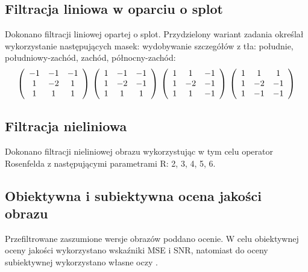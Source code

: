 \documentclass{classrep}
\begin{document}
\subsection{Filtracja liniowa w oparciu o splot}
\label{sec.tests.convolution}
Dokonano filtracji liniowej opartej o splot. Przydzielony wariant zadania określał wykorzystanie następujących masek: wydobywanie szczegółów z tła: południe, południowy-zachód, zachód, północny-zachód:
\begin{equation*}
\left(\begin{array}{ccc} -1 & -1 & -1 \\ 
1 & -2 & 1 \\
1 & 1 & 1 \\
\end{array}\right)\\
\\
\left(\begin{array}{ccc} 1 & -1 & -1 \\ 
1 & -2 & -1 \\
1 & 1 & 1 \\
\end{array}\right)\\
\\
\left(\begin{array}{ccc} 1 & 1 & -1 \\ 
1 & -2 & -1 \\
1 & 1 & -1 \\
\end{array}\right)\\
\\
\left(\begin{array}{ccc} 1 & 1 & 1 \\ 
1 & -2 & -1 \\
1 & -1 & -1 \\
\end{array}\right)
\end{equation*}

\subsection{Filtracja nieliniowa}
\label{sec.tests.filtering.nonlinear}
Dokonano filtracji nieliniowej obrazu wykorzystując w tym celu operator Rosenfelda z następującymi parametrami R: 2, 3, 4, 5, 6.

\subsection{Obiektywna i subiektywna ocena jakości obrazu}
\label{sec.tests.quality}
Przefiltrowane zaszumione wersje obrazów poddano ocenie. W celu obiektywnej oceny jakości wykorzystano wskaźniki MSE i SNR, natomiast do oceny subiektywnej wykorzystano własne oczy \smiley.
\end{document}
